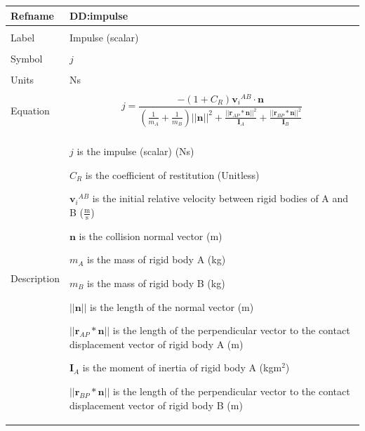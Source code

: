 \documentclass[12pt]{article}
\begin{document}
\noindent \begin{minipage}{\textwidth}
\begin{tabular}{p{} p{}}
\toprule \textbf{Refname} & \textbf{DD:impulse}
\label{DD:impulse}
\\ \midrule \\
Label & Impulse (scalar)
\\ \midrule \\
Symbol & $j$
\\ \midrule \\
Units & Ns
\\ \midrule \\
Equation & \begin{displaymath}
           j=\frac{-\left(1+{C_{R}}\right) {{\mathbf{v}_{i}}^{AB}}\cdot{}\mathbf{n}}{\left(\frac{1}{{m_{A}}}+\frac{1}{{m_{B}}}\right) ||\mathbf{n}||^{2}+\frac{||{\mathbf{r}_{AP}}*\mathbf{n}||^{2}}{{\mathbf{I}_{A}}}+\frac{||{\mathbf{r}_{BP}}*\mathbf{n}||^{2}}{{\mathbf{I}_{B}}}}
           \end{displaymath}
\\ \midrule \\
Description & \begin{symbDescription}
              \item{$j$ is the impulse (scalar) (Ns)}
              \item{${C_{R}}$ is the coefficient of restitution (Unitless)}
              \item{${{\mathbf{v}_{i}}^{AB}}$ is the initial relative velocity between rigid bodies of A and B ($\frac{\text{m}}{\text{s}}$)}
              \item{$\mathbf{n}$ is the collision normal vector (m)}
              \item{${m_{A}}$ is the mass of rigid body A (kg)}
              \item{${m_{B}}$ is the mass of rigid body B (kg)}
              \item{$||\mathbf{n}||$ is the length of the normal vector (m)}
              \item{$||{\mathbf{r}_{AP}}*\mathbf{n}||$ is the length of the perpendicular vector to the contact displacement vector of rigid body A (m)}
              \item{${\mathbf{I}_{A}}$ is the moment of inertia of rigid body A (kg$\text{m}^{2}$)}
              \item{$||{\mathbf{r}_{BP}}*\mathbf{n}||$ is the length of the perpendicular vector to the contact displacement vector of rigid body B (m)}

\end{symbDescription}
\end{tabular}
\end{minipage}
\end{document}

